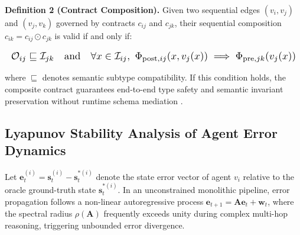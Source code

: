 \documentclass[10pt,journal,compsoc,twocolumn]{IEEEtran}
\begin{document}
\textbf{Definition 2 (Contract Composition).} Given two sequential edges $(v_i, v_j)$ and $(v_j, v_k)$ governed by contracts $c_{ij}$ and $c_{jk}$, their sequential composition $c_{ik} = c_{ij} \odot c_{jk}$ is valid if and only if:





















\begin{equation}
\resizebox{\columnwidth}{!}{$\displaystyle
\begin{aligned}
\mathcal{O}_{ij} \sqsubseteq \mathcal{I}_{jk} \quad \text{and} \quad \forall x \in \mathcal{I}_{ij},\ \Phi_{\text{post}, ij}(x, v_j(x)) \implies \Phi_{\text{pre}, jk}(v_j(x))
\end{aligned}
$}
\end{equation}





















where $\sqsubseteq$ denotes semantic subtype compatibility. If this condition holds, the composite contract guarantees end-to-end type safety and semantic invariant preservation without runtime schema mediation \cite{crossref_10_18653_v1_2026_findings_acl_1933}.


\subsection{Lyapunov Stability Analysis of Agent Error Dynamics}


Let $\mathbf{e}_t^{(i)} = \mathbf{s}_t^{(i)} - \mathbf{s}_t^{*(i)}$ denote the state error vector of agent $v_i$ relative to the oracle ground-truth state $\mathbf{s}_t^{*(i)}$. In an unconstrained monolithic pipeline, error propagation follows a non-linear autoregressive process $\mathbf{e}_{t+1} = \mathbf{A}\mathbf{e}_t + \mathbf{w}_t$, where the spectral radius $\rho(\mathbf{A})$ frequently exceeds unity during complex multi-hop reasoning, triggering unbounded error divergence.
\end{document}

